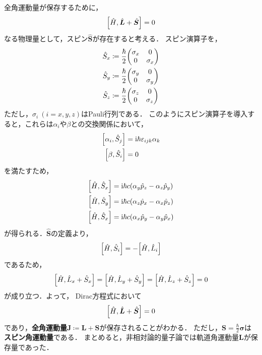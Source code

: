 \documentclass{report}
\begin{document}
  全角運動量が保存するために，
  \begin{align}
    \qty[\hat{H}, \hat{\bm{L}} + \hat{\bm{S}}] = 0
  \end{align}
  なる物理量として，スピン$\hat{\bm{S}}$が存在すると考える．
  スピン演算子を，
  \begin{align}
    \hat{S}_x &\coloneqq \frac{\hbar}{2}
    \mqty(
      \sigma_x & 0\\
      0 & \sigma_x
    ) \\
    \hat{S}_y &\coloneqq \frac{\hbar}{2}
    \mqty(
      \sigma_y & 0\\
      0 & \sigma_y
    ) \\
    \hat{S}_z &\coloneqq \frac{\hbar}{2}
    \mqty(
      \sigma_z & 0\\
      0 & \sigma_z
    )
  \end{align}
  ただし，$\sigma_i\ (i = x, y, z)$はPauli行列である．
  このようにスピン演算子を導入すると，これらは$\alpha_i$や$\beta$との交換関係において，
  \begin{align}
    \qty[\alpha_i, \hat{S}_j] &= \mathrm{i} \hbar \varepsilon_{ijk} \alpha_k\\
    \qty[\beta, \hat{S}_i] &= 0
  \end{align}
  を満たすため，
  \begin{align}
    \qty[\hat{H}, \hat{S}_x] &= \mathrm{i}\hbar c\qty(\alpha_y \hat{p}_z - \alpha_z \hat{p}_y)\\
    \qty[\hat{H}, \hat{S}_y] &= \mathrm{i}\hbar c\qty(\alpha_z \hat{p}_x - \alpha_x \hat{p}_z)\\
    \qty[\hat{H}, \hat{S}_x] &= \mathrm{i}\hbar c\qty(\alpha_x \hat{p}_y - \alpha_y \hat{p}_x)
  \end{align}
  が得られる．$\hat{\bm{S}}$の定義より，
  \begin{align}
    \qty[\hat{H}, \hat{S}_i] = - \qty[\hat{H}, \hat{L}_i]
  \end{align}
  であるため，
  \begin{align}
    \qty[\hat{H}, \hat{L}_x + \hat{S}_x] = \qty[\hat{H}, \hat{L}_y + \hat{S}_y] = \qty[\hat{H}, \hat{L}_z + \hat{S}_z] = 0
  \end{align}
  が成り立つ．よって，
  Dirac方程式において
  \begin{align}
    \qty[\hat{H}, \hat{\bm{L}} + \hat{\bm{S}}] = 0
  \end{align}
  であり，\textbf{全角運動量}$\bm{J} \coloneqq \bm{L} + \bm{S}$が保存されることがわかる． 
  ただし，$\bm{S} = \frac{\hbar}{2}\bm{\sigma}$は\textbf{スピン角運動量}である．
  まとめると，非相対論的量子論では軌道角運動量$\bm{L}$が保存量であった．
\end{document}
